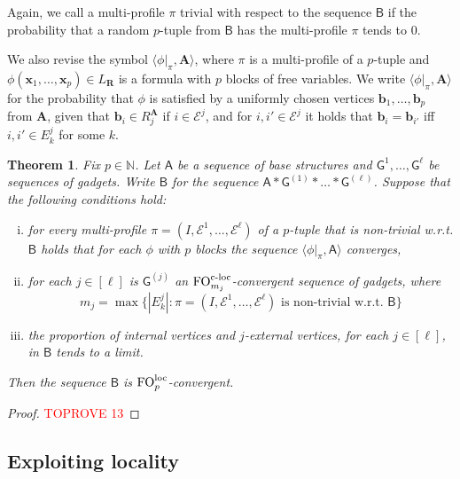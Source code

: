 \documentclass[11pt]{article}
\theoremstyle{plain}
\newtheorem{theorem}{Theorem}[section]
\theoremstyle{definition}
\theoremstyle{remark}
\newcommand{\N}{\mathbb{N}}
\DeclareMathOperator\FO{FO}
\newcommand{\FOloc}[1]{\FO_{#1}^\textnormal{loc}}
\newcommand{\FOcloc}[1]{\FO_{#1}^{\textnormal{c-loc}}}
\newcommand{\stonepar}[2]{\langle #1, #2 \rangle}
\newcommand{\str}[1]{\mathbf{#1}}
\newcommand{\strseq}[1]{{\boldsymbol{\mathsf{#1}}}}
\newcommand{\tpl}[1]{{\bm{#1}}}
\begin{document}
Again, we call a multi-profile $\pi$ trivial with respect to the sequence $\strseq{B}$ if the probability that a random $p$-tuple from $\strseq{B}$ has the multi-profile $\pi$ tends to $0$.

We also revise the symbol $\stonepar{\phi|_\pi}{\str{A}}$, where $\pi$ is a multi-profile of a $p$-tuple and $\phi(\tpl{x}_1, \dots, \tpl{x}_p) \in L_\tpl{R}$ is a formula with $p$ blocks of free variables.
We write $\stonepar{\phi|_\pi}{\str{A}}$ for the probability that $\phi$ is satisfied by a uniformly chosen vertices $\tpl{b}_1, \dots, \tpl{b}_p$ from $\str{A}$, given that $\tpl{b}_i \in R_j^\str{A}$ if $i \in \mathcal{E}^j$, and for $i, i' \in \mathcal{E}^j$ it holds that $\tpl{b}_i = \tpl{b}_{i'}$ iff $i, i' \in E^j_k$ for some $k$.

\begin{theorem}\label{thm:local_multiple_gadgets}
    Fix $p \in \N$.
    Let $\strseq{A}$ be a sequence of base structures and $\strseq{G}^{1}, \dots, \strseq{G}^{\ell}$ be sequences of gadgets.
    Write $\strseq{B}$ for the sequence $\strseq{A}*\strseq{G}^{(1)} * \dots *\strseq{G}^{(\ell)}$.
    Suppose that the following conditions hold:
    \begin{enumerate}[(i)]
        \item for every multi-profile $\pi = (I, \mathcal{E}^1, \dots, \mathcal{E}^\ell)$ of a $p$-tuple that is non-trivial w.r.t. $\strseq{B}$ holds that for each $\phi$ with $p$ blocks the sequence $\stonepar{\phi|_\pi}{\strseq{A}}$ converges,
        \item for each $j \in [\ell]$ is $\strseq{G}^{(j)}$ an $\FOcloc{m_j}$-convergent sequence of gadgets, where
        \[
            m_j = \max \{ |E^j_k| : \pi = (I, \mathcal{E}^1, \dots, \mathcal{E}^\ell) \text{ is non-trivial w.r.t. } \strseq{B} \}
        \]
        \item the proportion of internal vertices and $j$-external vertices, for each $j \in [\ell]$, in $\strseq{B}$ tends to a limit.
    \end{enumerate}
    Then the sequence $\strseq{B}$ is $\FOloc{p}$-convergent.
\end{theorem}
\begin{proof}\textcolor{red}{TOPROVE 13}\end{proof}

\subsection{Exploiting locality}\label{ssec:exploiting_locality}
\end{document}
